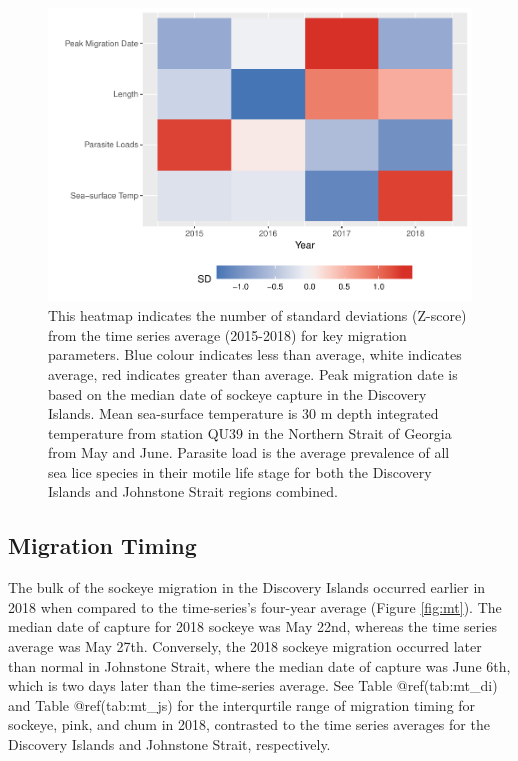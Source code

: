 \documentclass[fleqn,10pt]{wlpeerj} %
\begin{document}
\begin{figure}
\includegraphics[width=0.8\linewidth]{peer_j_migration_dynamics_files/figure-latex/heatmap-1} \caption{This heatmap indicates the number of standard deviations (Z-score) from the time series average (2015-2018) for key migration parameters. Blue colour indicates less than average, white indicates average, red indicates greater than average. Peak migration date is based on the median date of sockeye capture in the Discovery Islands.  Mean sea-surface temperature is 30 m depth integrated temperature from station QU39 in the Northern Strait of Georgia from May and June. Parasite load is the average prevalence of all sea lice species in their motile life stage for both the Discovery Islands and Johnstone Strait regions combined.}\label{fig:heatmap}
\end{figure}

\subsection*{Migration Timing}\label{migration-timing}

The bulk of the sockeye migration in the Discovery Islands occurred
earlier in 2018 when compared to the time-series's four-year average
(Figure \ref{fig:mt}). The median date of capture for 2018 sockeye was
May 22nd, whereas the time series average was May 27th. Conversely, the
2018 sockeye migration occurred later than normal in Johnstone Strait,
where the median date of capture was June 6th, which is two days later
than the time-series average. See Table @ref(tab:mt\_di) and Table
@ref(tab:mt\_js) for the interqurtile range of migration timing for
sockeye, pink, and chum in 2018, contrasted to the time series averages
for the Discovery Islands and Johnstone Strait, respectively.
\end{document}
